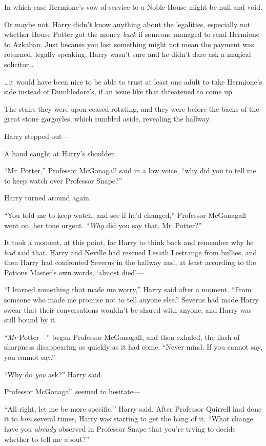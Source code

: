 In which case Hermione’s vow of service to a Noble House might be null and void.

Or maybe not. Harry didn’t know anything about the legalities, especially not whether House Potter got the money \emph{back} if someone managed to send Hermione to Azkaban. Just because you lost something might not mean the payment was returned, legally speaking. Harry wasn’t sure and he didn’t dare ask a magical solicitor…

…it would have been nice to be able to trust at least one adult to take Hermione’s side instead of Dumbledore’s, if an issue like that threatened to come up.

The stairs they were upon ceased rotating, and they were before the backs of the great stone gargoyles, which rumbled aside, revealing the hallway.

Harry stepped out—

A hand caught at Harry’s shoulder.

“Mr~Potter,” Professor McGonagall said in a low voice, “why did you to tell me to keep watch over Professor Snape?”

Harry turned around again.

“You told me to keep watch, and see if he’d changed,” Professor McGonagall went on, her tone urgent. “\emph{Why} did you say that, Mr~Potter?”

It took a moment, at this point, for Harry to think back and remember why he \emph{had} said that. Harry and Neville had rescued Lesath Lestrange from bullies, and then Harry had confronted Severus in the hallway and, at least according to the Potions Master’s own words, ‘almost died’—

“I learned something that made me worry,” Harry said after a moment. “From someone who made me promise not to tell anyone else.” Severus had made Harry swear that their conversations wouldn’t be shared with anyone, and Harry was still bound by it.

“\emph{Mr} Potter—” began Professor McGonagall, and then exhaled, the flash of sharpness disappearing as quickly as it had come. “Never mind. If you cannot say, you cannot say.”

“Why do \emph{you} ask?” Harry said.

Professor McGonagall seemed to hesitate—

“All right, let me be more specific,” Harry said. After Professor Quirrell had done it to \emph{him} several times, Harry was starting to get the hang of it. “What change have you \emph{already} observed in Professor Snape that you’re trying to decide whether to tell me about?”

